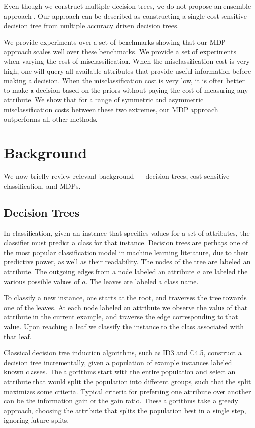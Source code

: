\documentclass[letterpaper]{article}
\theoremstyle{definition}
\begin{document}
Even though we construct multiple decision trees, we do not propose an ensemble approach \cite{banfield2007comparison}. Our approach can be described as constructing a single cost sensitive decision tree from multiple accuracy driven decision trees.

We provide experiments over a set of benchmarks \cite{LomaxV13} showing that our MDP approach scales well over these benchmarks. We provide a set of experiments when varying the cost of misclassification. When the misclassification cost is very high, one will query all available attributes that provide useful information before making a decision. When the misclassification cost is very low, it is often better to make a decision based on the priors without paying the cost of measuring any attribute. We show that for a range of symmetric and asymmetric misclassification costs between these two extremes, our MDP approach outperforms all other methods.

\section{Background}

We now briefly review relevant background --- decision trees, cost-sensitive classification, and MDPs.

\subsection{Decision Trees}

In classification, given an instance that specifies values for a set of attributes, the classifier must predict a class for that instance. Decision trees are perhaps one of the most popular classification model in machine learning literature, due to their predictive power, as well as their readability. The nodes of the tree are labeled  an attribute. The outgoing edges from a node labeled  an attribute $a$ are labeled  the various possible values of $a$. The leaves are labeled  a class name.

To classify a new instance, one starts at the root, and traverses the tree towards one of the leaves. At each node labeled  an attribute we observe the value of that attribute in the current example, and traverse the edge corresponding to that value. Upon reaching a leaf we classify the instance to the class associated with that leaf.

Classical decision tree induction algorithms, such as ID3 and C4.5, construct a decision tree incrementally, given a population of example instances labeled  known classes. The algorithms start with the entire population and select an attribute that would split the population into different groups, such that the split maximizes some criteria. Typical criteria for preferring one attribute over another can be the information gain or the gain ratio. These algorithms take a greedy approach, choosing the attribute that splits the population best in a single step, ignoring future splits.
\end{document}
